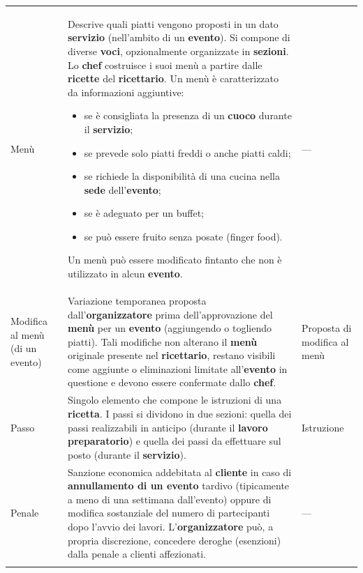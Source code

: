 \begin{longtable}{L{3.5cm} L{8.5cm} L{3cm}}
Menù
& Descrive quali piatti vengono proposti in un dato \textbf{servizio}
  (nell'ambito di un \textbf{evento}). Si compone di diverse \textbf{voci},
  opzionalmente organizzate in \textbf{sezioni}. Lo \textbf{chef} costruisce
  i suoi menù a partire dalle \textbf{ricette} del \textbf{ricettario}.
  Un menù è caratterizzato da informazioni aggiuntive:
  \begin{itemize}[nosep,leftmargin=*]
    \item se è consigliata la presenza di un \textbf{cuoco} durante il
          \textbf{servizio};
    \item se prevede solo piatti freddi o anche piatti caldi;
    \item se richiede la disponibilità di una cucina nella \textbf{sede}
          dell'\textbf{evento};
    \item se è adeguato per un buffet;
    \item se può essere fruito senza posate (finger food).
  \end{itemize}
  Un menù può essere modificato fintanto che non è utilizzato in alcun
  \textbf{evento}.
& — \\
\addlinespace

Modifica al menù (di un evento)
& Variazione temporanea proposta dall'\textbf{organizzatore} prima
  dell'approvazione del \textbf{menù} per un \textbf{evento} (aggiungendo o
  togliendo piatti). Tali modifiche non alterano il \textbf{menù} originale
  presente nel \textbf{ricettario}, restano visibili come aggiunte o
  eliminazioni limitate all'\textbf{evento} in questione e devono essere
  confermate dallo \textbf{chef}.
& Proposta di modifica al menù \\
\addlinespace

Passo
& Singolo elemento che compone le istruzioni di una \textbf{ricetta}. I passi
  si dividono in due sezioni: quella dei passi realizzabili in anticipo
  (durante il \textbf{lavoro preparatorio}) e quella dei passi da effettuare
  sul posto (durante il \textbf{servizio}).
& Istruzione \\
\addlinespace

Penale
& Sanzione economica addebitata al \textbf{cliente} in caso di
  \textbf{annullamento di un evento} tardivo (tipicamente a meno di una
  settimana dall'evento) oppure di modifica sostanziale del numero di
  partecipanti dopo l'avvio dei lavori. L'\textbf{organizzatore} può, a
  propria discrezione, concedere deroghe (esenzioni) dalla penale a
  clienti affezionati.
& — \\
\addlinespace


\end{longtable}

